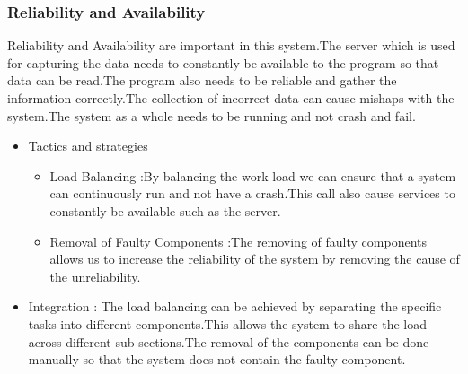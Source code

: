 \subsubsection{Reliability and Availability}	
\begin{flushleft}
Reliability and Availability are important in this system.The server which is used for capturing the data needs to constantly be available to the program so that data can be read.The program also needs to be reliable and gather the information correctly.The collection of incorrect data can cause mishaps with the system.The system as a whole needs to be running and not crash and fail.
\begin{itemize}
\item{Tactics and strategies}
\begin{itemize}
\item{Load Balancing} :By balancing the work load we can ensure that a system can continuously run and not have a crash.This call also cause services to constantly be available such as the server.
\item{Removal of Faulty Components} :The removing of faulty components allows us to increase the reliability of the system by removing the cause of the unreliability.
\end{itemize}

\item{Integration} :
The load balancing can be achieved by separating the specific tasks into different components.This allows the system to share the load across different sub sections.The removal of the components can be done manually so that the system does not contain the faulty component.
\end{itemize}

\end{flushleft}	
		
